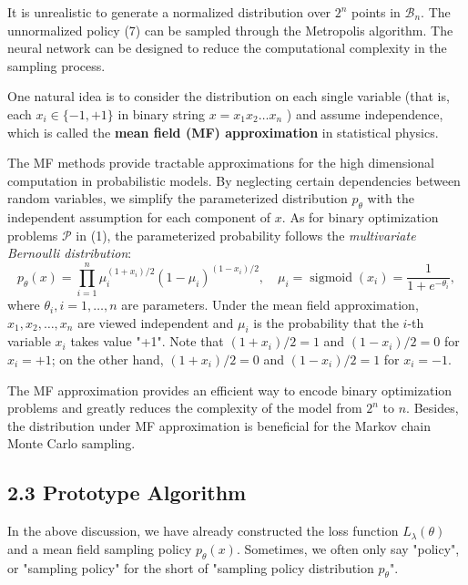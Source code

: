 It is unrealistic to generate a normalized distribution over $2^{n}$ points in $\mathcal{B}_{n}$. The unnormalized policy (7) can be sampled through the Metropolis algorithm. The neural network can be designed to reduce the computational complexity in the sampling process. %

One natural idea is to consider the distribution on each single variable (that is, each $x_{i} \in \{-1,+1\}$ in binary string $x=x_{1}x_{2}\dots x_{n}$ ) and assume independence, which is called the \textbf{mean field (MF) approximation} in statistical physics. 

The MF methods provide tractable approximations for the high dimensional computation in probabilistic models. By neglecting certain dependencies between random variables, we simplify the parameterized distribution $p_{\theta}$ with the independent assumption for each component of $x$. As for binary optimization problems $\mathcal{P}$ in (1), the parameterized probability follows the \textit{multivariate Bernoulli distribution}:
\begin{equation}
    p_{\theta}(x)=\prod_{i=1}^{n} \mu_{i}^{\left(1+x_{i}\right) / 2}\left(1-\mu_{i}\right)^{\left(1-x_{i}\right) / 2}, \quad \mu_{i}=\operatorname{sigmoid}(x_i)=\frac{1}{1+e^{-\theta_{i}}}, \tag{8}
\end{equation}
where $\theta_{i}, i=1, \ldots, n$ are parameters. Under the mean field approximation, $x_{1}, x_{2}, \ldots, x_{n}$ are viewed independent and $\mu_{i}$ is the probability that the $i$-th variable $x_{i}$ takes value "+1". Note that $\left(1+x_{i}\right)/2=1$ and $\left(1-x_{i}\right)/2=0$ for $x_i = +1$; on the other hand, $\left(1+x_{i}\right)/2=0$ and $\left(1-x_{i}\right)/2=1$ for $x_i = -1$.

The MF approximation provides an efficient way to encode binary optimization problems and greatly reduces the complexity of the model from $2^{n}$ to $n$. Besides, the distribution under MF approximation is beneficial for the Markov chain Monte Carlo sampling. %

\subsection{2.3 Prototype Algorithm}

In the above discussion, we have already constructed the loss function $L_{\lambda}(\theta)$ and a mean field sampling policy $p_{\theta}(x)$. Sometimes, we often only say "policy", or "sampling policy" for the short of "sampling policy distribution $p_{\theta}$".

